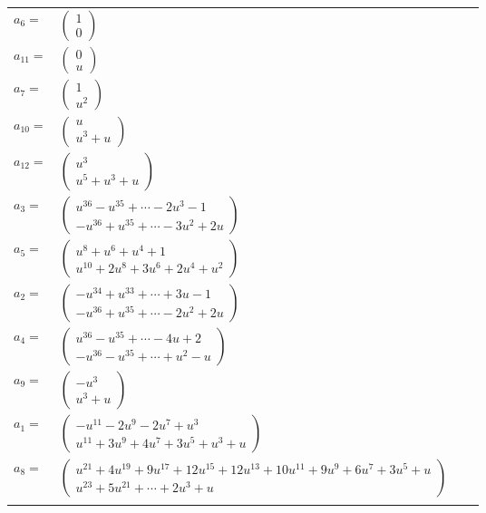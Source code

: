\documentclass[1p]{elsarticle_modified}
\theoremstyle{definition}
\begin{document}
\begin{tabular}{m{7pt} m{180pt} m{7pt} m{180pt} }
\flushright $a_{6}=$&$\begin{pmatrix}1\\0\end{pmatrix}$ \\
\flushright $a_{11}=$&$\begin{pmatrix}0\\u\end{pmatrix}$ \\
\flushright $a_{7}=$&$\begin{pmatrix}1\\u^2\end{pmatrix}$ \\
\flushright $a_{10}=$&$\begin{pmatrix}u\\u^3+u\end{pmatrix}$ \\
\flushright $a_{12}=$&$\begin{pmatrix}u^3\\u^5+u^3+u\end{pmatrix}$ \\
\flushright $a_{3}=$&$\begin{pmatrix}u^{36}- u^{35}+\cdots-2 u^3-1\\- u^{36}+u^{35}+\cdots-3 u^2+2 u\end{pmatrix}$ \\
\flushright $a_{5}=$&$\begin{pmatrix}u^8+u^6+u^4+1\\u^{10}+2 u^8+3 u^6+2 u^4+u^2\end{pmatrix}$ \\
\flushright $a_{2}=$&$\begin{pmatrix}- u^{34}+u^{33}+\cdots+3 u-1\\- u^{36}+u^{35}+\cdots-2 u^2+2 u\end{pmatrix}$ \\
\flushright $a_{4}=$&$\begin{pmatrix}u^{36}- u^{35}+\cdots-4 u+2\\- u^{36}- u^{35}+\cdots+u^2- u\end{pmatrix}$ \\
\flushright $a_{9}=$&$\begin{pmatrix}- u^3\\u^3+u\end{pmatrix}$ \\
\flushright $a_{1}=$&$\begin{pmatrix}- u^{11}-2 u^9-2 u^7+u^3\\u^{11}+3 u^9+4 u^7+3 u^5+u^3+u\end{pmatrix}$ \\
\flushright $a_{8}=$&$\begin{pmatrix}u^{21}+4 u^{19}+9 u^{17}+12 u^{15}+12 u^{13}+10 u^{11}+9 u^9+6 u^7+3 u^5+u\\u^{23}+5 u^{21}+\cdots+2 u^3+u\end{pmatrix}$\\&\end{tabular}
\end{document}
